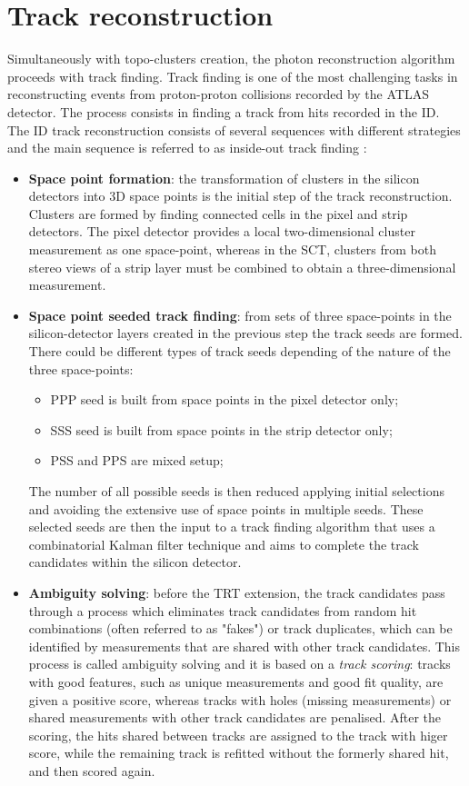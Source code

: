 \documentclass[a4paper, oneside, 11pt, openright]{book}
\begin{document}
		\section{Track reconstruction}
			Simultaneously with topo-clusters creation, the photon reconstruction algorithm proceeds with track finding. Track finding is one of the most challenging tasks in reconstructing events from proton-proton  collisions  recorded  by  the  ATLAS  detector. The process consists in finding a track from hits recorded in the ID. The ID track reconstruction consists of several sequences with different strategies and the main sequence is referred to as inside-out track finding \cite{ID_track1}: 
			\begin{itemize}
				\item \textbf{Space point formation}: the transformation of clusters in the silicon detectors into 3D space points is the initial step of the track reconstruction.  Clusters are formed by finding connected cells in the pixel and strip detectors. The pixel detector provides a local two-dimensional cluster measurement as one space-point, whereas in the SCT, clusters from both stereo views of a strip layer must be combined to obtain a three-dimensional measurement.

				\item \textbf{Space point seeded track finding}: from sets of three space-points in the silicon-detector layers created in the previous step the track seeds are formed. There could be different types of track seeds depending of the nature of the three space-points: 
				\begin{itemize}
					\item PPP seed is built from space points in the pixel detector only;
					\item SSS seed is built from space points in the strip detector only;
					\item PSS and PPS are mixed setup;
				\end{itemize}
				The number of all possible seeds is then reduced applying initial selections and avoiding the extensive use of space points in multiple seeds. These selected seeds are then the input to a track finding algorithm that uses a combinatorial Kalman filter technique \cite{Kalman} and aims to complete the track candidates within the silicon detector.
				
				\item \textbf{Ambiguity solving}: before the TRT extension, the track candidates pass through a process which eliminates track candidates from random hit combinations (often referred to as "fakes") or track duplicates, which can be identified by measurements that are shared with other track candidates. This process is called ambiguity solving and it is based on a \textit{track scoring}: tracks with good features, such as unique measurements and good fit quality, are given a positive score, whereas tracks with holes (missing measurements) or shared measurements with other track candidates are penalised. After the scoring, the hits shared between tracks are assigned to the track with higer score, while the remaining track is refitted without the formerly shared hit, and then scored again.
				

\end{itemize}
\end{document}
